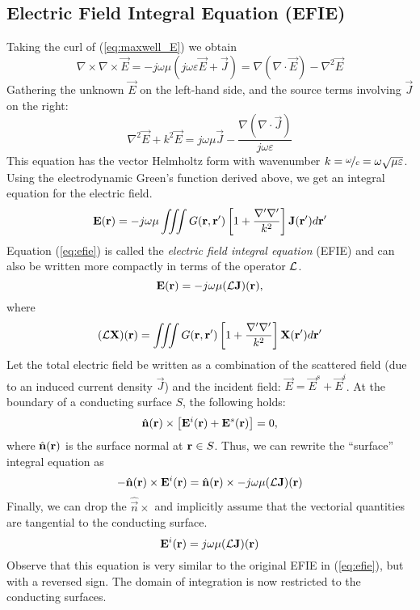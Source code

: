 \subsection{Electric Field Integral Equation (EFIE)}
\label{sec:em_efie}
Taking the curl of (\ref{eq:maxwell_E}) we obtain
\begin{equation*}
	\nabla \times \nabla \times \vec{E}  = -j\omega\mu (j\omega\varepsilon \vec{E} + \vec{J}) = \nabla (\nabla \cdot \vec{E}) - \nabla^2 \vec{E}
\end{equation*}
Gathering the unknown $\vec{E}$ on the left-hand side, and the source terms involving $\vec{J}$ on the right:
\begin{equation}
	\nabla^2 \vec{E} + k^2 \vec{E} = j\omega\mu\vec{J} - \frac{\nabla (\nabla \cdot \vec{J})}{j\omega\varepsilon}
\end{equation}
This equation has the vector Helmholtz form with wavenumber $k = \nicefrac{\omega}{c} = \omega \sqrt{\mu \varepsilon}$. Using the electrodynamic Green's function derived above, we get an integral equation for the electric field.
\begin{equation}
	\mathbf{E}(\mathbf{r}) = -j\omega\mu \iiint G(\mathbf{r}, \mathbf{r}^\prime) \left[ 1 + \frac
	{\nabla^\prime \nabla^\prime}{k^2} \right] \mathbf{J}(\mathbf{r}^\prime) d\mathbf{r}^\prime
	\label{eq:efie}
\end{equation}
Equation (\ref{eq:efie}) is called the \emph{electric field integral equation} (EFIE) and can also be written more compactly in terms of the operator $\mathcal{L}$.
\begin{equation}
	\mathbf{E}(\mathbf{r}) = -j\omega\mu (\mathcal{L} \mathbf{J})(\mathbf{r}),
\end{equation}
where
\begin{equation}
	(\mathcal{L}\mathbf{X})(\mathbf{r}) = \iiint G(\mathbf{r}, \mathbf{r}^\prime) \left[ 1 + \frac{\nabla^\prime \nabla^\prime}{k^2} \right] \mathbf{X}(\mathbf{r}^\prime) d\mathbf{r}^\prime
\end{equation}
Let the total electric field be written as a combination of the scattered field (due to an induced current density $\vec{J}$) and the incident field: $\vec{E} = \vec{E}^{s} + \vec{E}^{i}$. At the boundary of a conducting surface $S$, the following holds:
\begin{equation}
	\hat{\mathbf{n}}(\mathbf{r}) \times \left[ \mathbf{E}^i(\mathbf{r}) + \mathbf{E}^s(\mathbf{r}) \right] = 0,
\end{equation}
where $\hat{\mathbf{n}}(\mathbf{r})$ is the surface normal at $\mathbf{r} \in S$. Thus, we can rewrite the ``surface'' integral equation as
\begin{equation}
	-\hat{\mathbf{n}}(\mathbf{r}) \times \mathbf{E}^i(\mathbf{r}) = \hat{\mathbf{n}}(\mathbf{r}) \times -j\omega\mu(\mathcal{L} \mathbf{J})(\mathbf{r})
\end{equation}
Finally, we can drop the $\hat{\vec{n}} \times$ and implicitly assume that the vectorial quantities are tangential to the conducting surface.
\begin{equation}
	\mathbf{E}^i(\mathbf{r}) = j\omega\mu(\mathcal{L} \mathbf{J})(\mathbf{r})
	\label{eq:surf_efie}
\end{equation}
Observe that this equation is very similar to the original EFIE in (\ref{eq:efie}), but with a reversed sign. The domain of integration is now restricted to the conducting surfaces.